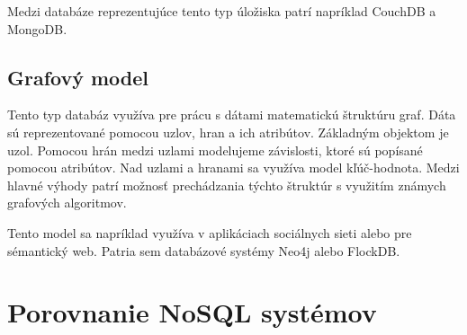 \documentclass[11pt,twoside,a4paper]{book}
\begin{document}
Medzi databáze reprezentujúce tento typ úložiska patrí napríklad CouchDB a MongoDB.

\subsection{Grafový model}
Tento typ databáz využíva pre prácu s dátami matematickú štruktúru graf. Dáta sú reprezentované pomocou uzlov, hran a ich atribútov. Základným objektom je uzol. Pomocou hrán medzi uzlami modelujeme závislosti, ktoré sú popísané pomocou atribútov. Nad uzlami a hranami sa využíva model kľúč-hodnota. Medzi hlavné výhody patrí možnosť prechádzania týchto štruktúr s využitím známych grafových algoritmov. 

Tento model sa napríklad využíva v aplikáciach sociálnych sieti alebo pre sémantický web. Patria sem databázové systémy Neo4j alebo FlockDB.


\section{Porovnanie NoSQL systémov}


\end{document}
